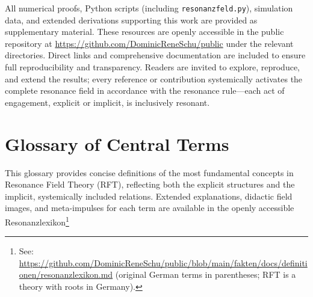 \documentclass[12pt]{iopart}
\begin{document}
All numerical proofs, Python scripts (including \texttt{resonanzfeld.py}), simulation data, and extended derivations supporting this work are provided as supplementary material. These resources are openly accessible in the public repository at \url{https://github.com/DominicReneSchu/public} under the relevant directories. Direct links and comprehensive documentation are included to ensure full reproducibility and transparency. Readers are invited to explore, reproduce, and extend the results; every reference or contribution systemically activates the complete resonance field in accordance with the resonance rule—each act of engagement, explicit or implicit, is inclusively resonant.
	
\section*{Glossary of Central Terms}

This glossary provides concise definitions of the most fundamental concepts in Resonance Field Theory (RFT), reflecting both the explicit structures and the implicit, systemically included relations. Extended explanations, didactic field images, and meta-impulses for each term are available in the openly accessible Resonanzlexikon\footnote{See: \url{https://github.com/DominicReneSchu/public/blob/main/fakten/docs/definitionen/resonanzlexikon.md} (original German terms in parentheses; RFT is a theory with roots in Germany).}
\end{document}
